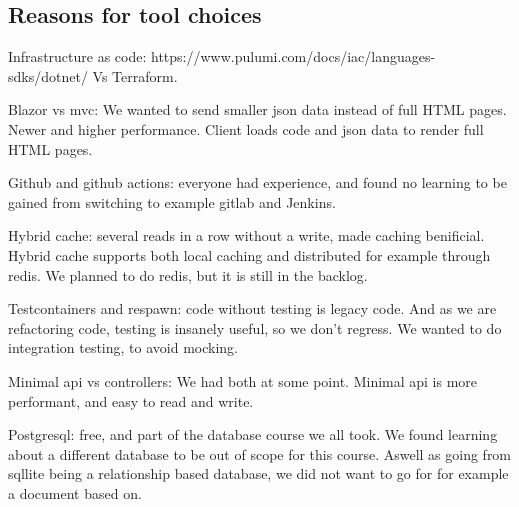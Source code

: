 \subsection{Reasons for tool choices}

Infrastructure as code:
https://www.pulumi.com/docs/iac/languages-sdks/dotnet/
Vs
Terraform.

Blazor vs mvc:
We wanted to send smaller json data instead of full HTML pages. Newer and higher performance. Client loads code and json data to render full HTML pages.

Github and github actions: everyone had experience, and found no learning to be gained from switching to example gitlab and Jenkins.

Hybrid cache: several reads in a row without a write, made caching benificial. Hybrid cache supports both local caching and distributed for example through redis. We planned to do redis, but it is still in the backlog.

Testcontainers and respawn: code without testing is legacy code. And as we are refactoring code, testing is insanely useful, so we don't regress. 
We wanted to do integration testing, to avoid mocking.

Minimal api vs controllers:
We had both at some point. Minimal api is more performant, and easy to read and write. 

Postgresql: free, and part of the database course we all took. We found learning about a different database to be out of scope for this course. Aswell as going from sqllite being a relationship based database, we did not want to go for for example a document based on.